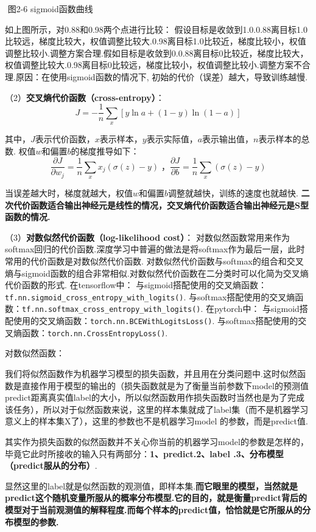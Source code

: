 ​ 图2-6 sigmoid函数曲线

如上图所示，对0.88和0.98两个点进行比较： ​
假设目标是收敛到1.0.0.88离目标1.0比较远，梯度比较大，权值调整比较大.0.98离目标1.0比较近，梯度比较小，权值调整比较小.调整方案合理.
​
假如目标是收敛到0.0.88离目标0比较近，梯度比较大，权值调整比较大.0.98离目标0比较远，梯度比较小，权值调整比较小.调整方案不合理.
​ 原因：在使用sigmoid函数的情况下,
初始的代价（误差）越大，导致训练越慢.

（2）\textbf{交叉熵代价函数（cross-entropy）}： \[
J = -\frac{1}{n}\sum_x[y\ln a + (1-y)\ln{(1-a)}]
\]

其中，$J$表示代价函数，$x$表示样本，$y$表示实际值，$a$表示输出值，$n$表示样本的总数.
权值$w$和偏置$b​$的梯度推导如下： \[
\frac{\partial J}{\partial w_j}=\frac{1}{n}\sum_{x}x_j(\sigma{(z)}-y)\;，
\frac{\partial J}{\partial b}=\frac{1}{n}\sum_{x}(\sigma{(z)}-y)
\]

当误差越大时，梯度就越大，权值$w$和偏置$b$调整就越快，训练的速度也就越快.
\textbf{二次代价函数适合输出神经元是线性的情况，交叉熵代价函数适合输出神经元是S型函数的情况.}

（3）\textbf{对数似然代价函数（log-likelihood cost）}：
对数似然函数常用来作为softmax回归的代价函数.深度学习中普遍的做法是将softmax作为最后一层，此时常用的代价函数是对数似然代价函数.
对数似然代价函数与softmax的组合和交叉熵与sigmoid函数的组合非常相似.对数似然代价函数在二分类时可以化简为交叉熵代价函数的形式.
在tensorflow中：
与sigmoid搭配使用的交叉熵函数：\texttt{tf.nn.sigmoid\_cross\_entropy\_with\_logits()}.
与softmax搭配使用的交叉熵函数：\texttt{tf.nn.softmax\_cross\_entropy\_with\_logits()}.
在pytorch中：
与sigmoid搭配使用的交叉熵函数：\texttt{torch.nn.BCEWithLogitsLoss()}.
与softmax搭配使用的交叉熵函数：\texttt{torch.nn.CrossEntropyLoss()}.

对数似然函数：

​
我们将似然函数作为机器学习模型的损失函数，并且用在分类问题中.这时似然函数是直接作用于模型的输出的（损失函数就是为了衡量当前参数下model的预测值predict距离真实值label的大小，所以似然函数用作损失函数时当然也是为了完成该任务），所以对于似然函数来说，这里的样本集就成了label集（而不是机器学习意义上的样本集X了），这里的参数也不是机器学习model
的参数，而是predict值.

其实作为损失函数的似然函数并不关心你当前的机器学习model的参数是怎样的，毕竟它此时所接收的输入只有两部分：\textbf{1、predict.2、label
.3、分布模型（predict服从的分布）}.

显然这里的label就是似然函数的观测值，即样本集.\textbf{而它眼里的模型，当然就是predict这个随机变量所服从的概率分布模型.它的目的，就是衡量predict背后的模型对于当前观测值的解释程度.而每个样本的predict值，恰恰就是它所服从的分布模型的参数.}

